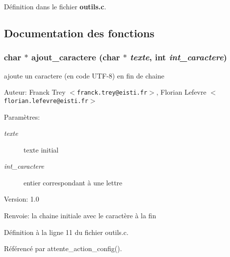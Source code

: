 D\'{e}finition dans le fichier {\bf outils.c}.

\subsection{Documentation des fonctions}
\subsubsection{\setlength{\rightskip}{0pt plus 5cm}char $\ast$ ajout\_\-caractere (char $\ast$ {\em texte}, int {\em int\_\-caractere})}\label{outils_8c_1020af4a7a407165a0f3b4e75307a3fc}


ajoute un caractere (en code UTF-8) en fin de chaine 

\begin{Desc}
\item[Auteur:]Franck Trey $<${\tt franck.trey@eisti.fr}$>$, Florian Lefevre $<${\tt florian.lefevre@eisti.fr}$>$\end{Desc}
\begin{Desc}
\item[Param\`{e}tres:]
\begin{description}
\item[{\em texte}]texte initial \item[{\em int\_\-caractere}]entier correspondant \`{a} une lettre\end{description}
\end{Desc}
\begin{Desc}
\item[Version:]1.0 \end{Desc}
\begin{Desc}
\item[Renvoie:]la chaine initiale avec le caract\`{e}re \`{a} la fin \end{Desc}


D\'{e}finition \`{a} la ligne 11 du fichier outils.c.

R\'{e}f\'{e}renc\'{e} par attente\_\-action\_\-config().

